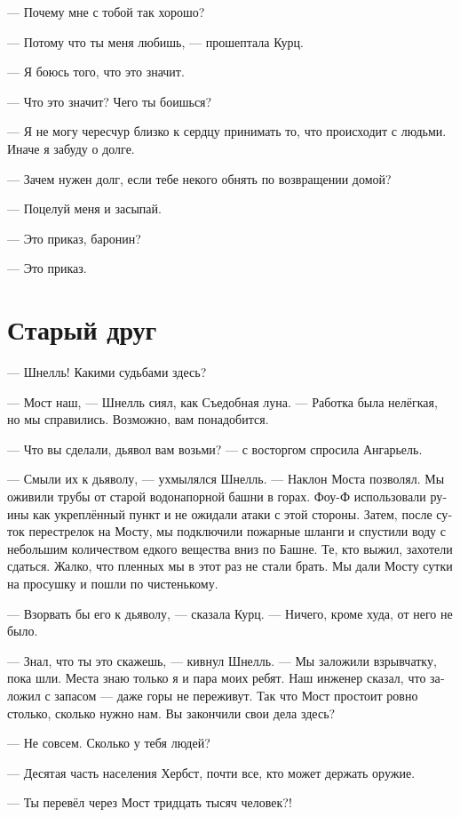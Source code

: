 \documentclass[a4paper,12pt,fleqn]{book}\usepackage{cooltooltips}\usepackage{polyglossia}\setdefaultlanguage[babelshorthands=true]{russian}\setotherlanguage{english}\defaultfontfeatures{Ligatures=TeX,Mapping=tex-text} \usepackage{xcolor}\definecolor{lightgray}{HTML}{bbbbbb}\color{lightgray}\newcommand{\ml}[3]{\textenglish{\textcolor{black}{#3}}}
\begin{document}
--- Почему мне с тобой так хорошо?

--- Потому что ты меня любишь, --- прошептала Курц.

--- Я боюсь того, что это значит.

--- Что это значит?
Чего ты боишься?

--- Я не могу чересчур близко к сердцу принимать то, что происходит с людьми.
Иначе я забуду о долге.

--- Зачем нужен долг, если тебе некого обнять по возвращении домой?

--- Поцелуй меня и засыпай.

--- Это приказ, баронин?

--- Это приказ.

\section{Старый друг}

--- Шнелль!
Какими судьбами здесь?

--- Мост наш, --- Шнелль сиял, как Съедобная луна.
--- Работка была нелёгкая, но мы справились.
Возможно, вам понадобится.

--- Что вы сделали, дьявол вам возьми? --- с восторгом спросила Ангарьель.

--- Смыли их к дьяволу, --- ухмылялся Шнелль.
--- Наклон Моста позволял.
Мы оживили трубы от старой водонапорной башни в горах.
Фоу-Ф использовали руины как укреплённый пункт и не ожидали атаки с этой стороны.
Затем, после суток перестрелок на Мосту, мы подключили пожарные шланги и спустили воду с небольшим количеством едкого вещества вниз по Башне.
Те, кто выжил, захотели сдаться.
Жалко, что пленных мы в этот раз не стали брать.
Мы дали Мосту сутки на просушку и пошли по чистенькому.

--- Взорвать бы его к дьяволу, --- сказала Курц.
--- Ничего, кроме худа, от него не было.

--- Знал, что ты это скажешь, --- кивнул Шнелль.
--- Мы заложили взрывчатку, пока шли.
Места знаю только я и пара моих ребят.
Наш инженер сказал, что заложил с запасом --- даже горы не переживут.
Так что Мост простоит ровно столько, сколько нужно нам.
Вы закончили свои дела здесь?

--- Не совсем.
Сколько у тебя людей?

--- Десятая часть населения Хербст, почти все, кто может держать оружие.

--- Ты перевёл через Мост тридцать тысяч человек?!
\end{document}
